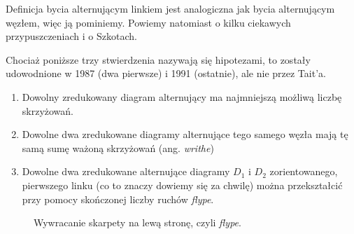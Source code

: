 \documentclass{article}
\begin{document}
Definicja bycia alternującym linkiem jest analogiczna jak bycia alternującym węzłem, więc ją pominiemy. Powiemy natomiast o kilku ciekawych przypuszczeniach i o Szkotach. %

\begin{thm}
  Chociaż poniższe trzy stwierdzenia nazywają się hipotezami, to zostały udowodnione w 1987 (dwa pierwsze) i 1991 (ostatnie), ale nie przez Tait'a.
  \begin{enumerate}
    \item Dowolny zredukowany diagram alternujący ma najmniejszą możliwą liczbę skrzyżowań.
    \item Dowolne dwa zredukowane diagramy alternujące tego samego węzła mają tę samą sumę ważoną skrzyżowań (ang. \emph{writhe})
    \item Dowolne dwa zredukowane alternujące diagramy $D_1$ i $D_2$ zorientowanego, pierwszego linku (co to znaczy dowiemy się za chwilę) można przekształcić przy pomocy skończonej liczby ruchów \emph{flype}.
  \end{enumerate}
\end{thm}

\begin{figure}[h]\centering
  \caption{\label{flype}Wywracanie skarpety na lewą stronę, czyli \emph{flype}.}
\end{figure}
\end{document}
